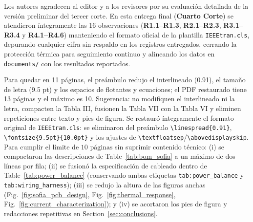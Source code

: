 \documentclass{LabDSTresponse}
\begin{document}


Los autores agradecen al editor y a los revisores por su evaluación detallada de la versión preliminar del tercer corte. En esta entrega final (\textbf{Cuarto Corte}) se atendieron íntegramente las 16 observaciones (\textbf{R1.1--R1.3}, \textbf{R2.1--R2.3}, \textbf{R3.1--R3.4} y \textbf{R4.1--R4.6}) manteniendo el formato oficial de la plantilla \texttt{IEEEtran.cls}, depurando cualquier cifra sin respaldo en los registros entregados, cerrando la protección térmica para seguimiento continuo y alineando los datos en \texttt{documents/} con los resultados reportados.

\LabDSTsummary


{Para quedar en 11 páginas, el preámbulo redujo el interlineado (0.91), el tamaño de letra (9.5 pt) y los espacios de flotantes y ecuaciones; el PDF restaurado tiene 13 páginas y el máximo es 10. Sugerencia: no modifiquen el interlineado ni la letra, compacten la Tabla III, fusionen la Tabla VII con la Tabla VI y eliminen repeticiones entre texto y pies de figura.}
{Se restauró íntegramente el formato original de \texttt{IEEEtran.cls}: se eliminaron del preámbulo \texttt{\textbackslash linespread\{0.91\}}, \texttt{\textbackslash fontsize\{9.5pt\}\{10.0pt\}} y los ajustes de \texttt{\textbackslash textfloatsep}/\texttt{\textbackslash abovedisplayskip}. Para cumplir el límite de $10\text{ páginas}$ sin suprimir contenido técnico: (i) se compactaron las descripciones de Table~\ref{tab:bom_sofia} a un máximo de dos líneas por fila; (ii) se fusionó la especificación de cableado dentro de Table~\ref{tab:power_balance} (conservando ambas etiquetas \texttt{tab:power\_balance} y \texttt{tab:wiring\_harness}); (iii) se redujo la altura de las figuras anchas (Fig.~\ref{fig:sofia_pcb_design}, Fig.~\ref{fig:thermal_response}, Fig.~\ref{fig:current_characterization}); y (iv) se acortaron los pies de figura y redacciones repetitivas en Section~\ref{sec:conclusions}.}
\end{document}
